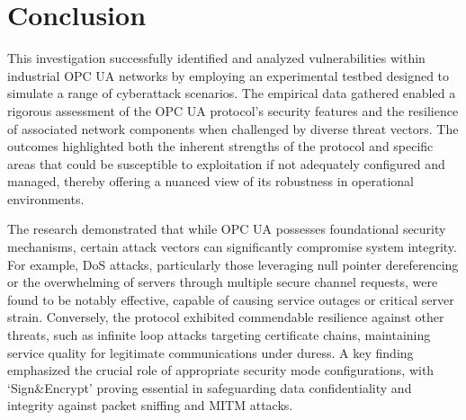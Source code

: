 \documentclass[pdflatex,sn-mathphys-num,iicol]{sn-jnl}%
\begin{document}
\section{Conclusion}\label{sec13}

This investigation successfully identified and analyzed vulnerabilities within industrial OPC UA networks by employing an experimental testbed designed to simulate a range of cyberattack scenarios. The empirical data gathered enabled a rigorous assessment of the OPC UA protocol's security features and the resilience of associated network components when challenged by diverse threat vectors. The outcomes highlighted both the inherent strengths of the protocol and specific areas that could be susceptible to exploitation if not adequately configured and managed, thereby offering a nuanced view of its robustness in operational environments.

The research demonstrated that while OPC UA possesses foundational security mechanisms, certain attack vectors can significantly compromise system integrity. For example, DoS attacks, particularly those leveraging null pointer dereferencing or the overwhelming of servers through multiple secure channel requests, were found to be notably effective, capable of causing service outages or critical server strain. Conversely, the protocol exhibited commendable resilience against other threats, such as infinite loop attacks targeting certificate chains, maintaining service quality for legitimate communications under duress. A key finding emphasized the crucial role of appropriate security mode configurations, with `Sign\&Encrypt' proving essential in safeguarding data confidentiality and integrity against packet sniffing and MITM attacks.




\end{document}
